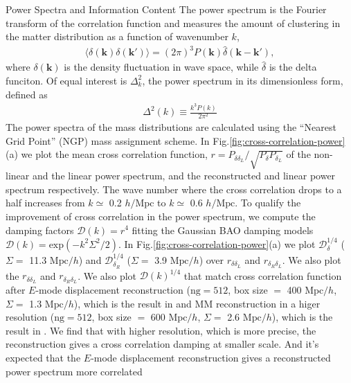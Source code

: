 \begin{section}{Power Spectra and Information Content}
  \label{sec:fisherinfo}
    The power spectrum is the Fourier transform of the correlation function and measures
 the amount of clustering in the matter distribution as a function of wavenumber $k$,
\begin{align}
    \langle \delta \left( \bm{k} \right) \delta \left( \bm{k'}\right) \rangle =
\left( 2\pi \right) ^3 P \left( \bm{k} \right) \hat{\delta} \left( \bm{k}-\bm{k'} \right),
\end{align}
where $\delta \left( \bm{k} \right)$ is the density fluctuation in wave space, while 
$\hat{\delta}$ is the delta funciton. Of equal interest is $\Delta ^2_k$, the power 
spectrum in its dimensionless form, defined as
\begin{align}
    \Delta ^2(k) \equiv \frac{k^3 P \left( k \right)}{2\pi ^2}
\end{align}
    The power spectra of the mass distributions are calculated using the \enquote{Nearest Grid Point} 
(NGP) mass assignment scheme. In Fig.\ref{fig:cross-correlation-power}(a) we plot the mean cross correlation 
function, $r=P_{\delta \delta_L}/\sqrt{P_\delta P_{\delta_L}}$ of the non-linear and the 
linear power spectrum, and the reconstructed and 
linear power spectrum respectively. The wave number where the cross correlation drops to a half increases 
from $k\simeq$ 0.2 $h/\mathrm{Mpc}$ to $k \simeq$ 0.6 $h/\mathrm{Mpc}$. 
To qualify the improvement of cross correlation in the 
power spectrum, we compute the damping factors $\mathcal{D}(k)=r^4$ fitting the Gaussian BAO damping models 
$\mathcal{D}(k)=\mathrm{exp}(-k^2 \Sigma^2/2)$. In Fig.\ref{fig:cross-correlation-power}(a) 
we plot $\mathcal{D}_\delta^{1/4}$ ($\Sigma =$ 11.3 $\mathrm{Mpc}/h$) and $\mathcal{D}_{\delta_R}^{1/4}$ 
($\Sigma = $ 3.9 $\mathrm{Mpc}/h$) over $r_{\delta\delta_L}$ and $r_{\delta_R\delta_L}$. 
We also plot the $r_{\delta\delta_L}$ and $r_{\delta_R\delta_L}$. We also plot $\mathcal{D}(k)^{1/4}$ 
that match cross correlation function after $E$-mode displacement 
reconstruction ($\mathrm{ng}=512$, box size $=$ 400 $\mathrm{Mpc}/h$, $\Sigma =$ 1.3 $\mathrm{Mpc}/h$), 
which is the result in \cite{bib:Yu2016} and 
MM reconstruction in a higer resolution ($\mathrm{ng}=512$, box size $=$ 600 $\mathrm{Mpc}/h$, $\Sigma =$ 2.6 $\mathrm{Mpc}/h$), 
which is the result in \cite{bib:ZhuH2016}. We find that with higher resolution, which is more precise, 
the reconstruction gives a cross correlation damping at smaller scale. 
And it's expected that the $E$-mode displacement reconstruction gives a reconstructed power spectrum more correlated 

\end{section}
